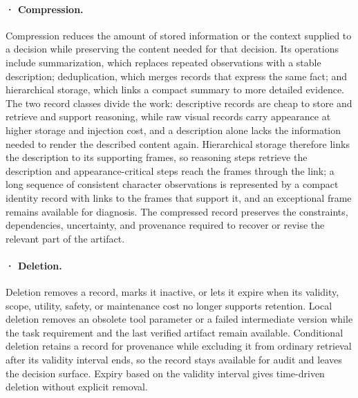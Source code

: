 \paragraph{· Compression.} Compression reduces the amount of stored information or the context supplied to a decision while preserving the content needed for that decision. Its operations include summarization, which replaces repeated observations with a stable description; deduplication, which merges records that express the same fact; and hierarchical storage, which links a compact summary to more detailed evidence. The two record classes divide the work: descriptive records are cheap to store and retrieve and support reasoning, while raw visual records carry appearance at higher storage and injection cost, and a description alone lacks the information needed to render the described content again. Hierarchical storage therefore links the description to its supporting frames, so reasoning steps retrieve the description and appearance-critical steps reach the frames through the link; a long sequence of consistent character observations is represented by a compact identity record with links to the frames that support it, and an exceptional frame remains available for diagnosis. The compressed record preserves the constraints, dependencies, uncertainty, and provenance required to recover or revise the relevant part of the artifact.

\paragraph{· Deletion.} Deletion removes a record, marks it inactive, or lets it expire when its validity, scope, utility, safety, or maintenance cost no longer supports retention. Local deletion removes an obsolete tool parameter or a failed intermediate version while the task requirement and the last verified artifact remain available. Conditional deletion retains a record for provenance while excluding it from ordinary retrieval after its validity interval ends, so the record stays available for audit and leaves the decision surface. Expiry based on the validity interval gives time-driven deletion without explicit removal.

